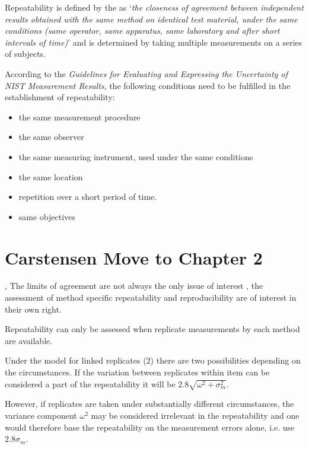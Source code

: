 \documentclass[12pt, a4paper]{report}
\theoremstyle{plain}
\theoremstyle{definition}
\theoremstyle{remark}
\begin{document}
		Repeatability is defined by the \citet{IUPAC} as `\textit{the closeness of agreement between independent results obtained with the same method on identical test material, under the same conditions (same
			operator, same apparatus, same laboratory and after short intervals of time)}'  and is determined by taking multiple measurements on a series of subjects.
	
	
		According to the \textit{Guidelines for Evaluating and Expressing the Uncertainty of NIST Measurement Results}, the following conditions need to be fulfilled in the establishment of repeatability:
		\begin{itemize}
			\item	the same measurement procedure
			\item	the same observer
			\item	the same measuring instrument, used under the same conditions
			\item	the same location
			\item	repetition over a short period of time.
			\item  same objectives
		\end{itemize}
		
		
	
		




	\section{Carstensen Move to Chapter 2}
	, The limits of agreement are not always the only issue of
	interest , the assessment of method specific repeatability and
	reproducibility are of interest in their own right.
	
	Repeatability can only be assessed when replicate
	measurements by each method are available.
	
	Under the model for linked replicates (2) there are two
	possibilities depending on the circumstances.
	If the variation between replicates within item can be
	considered a part of the repeatability it will be $2.8 \sqrt{
		\omega^2 + \sigma^2_m}$.
	
	However, if replicates are taken under substantially
	different circumstances, the variance component $\omega^2$ may be
	considered irrelevant in the repeatability and one would therefore
	base the repeatability on the measurement errors alone, i.e. use
	$2.8 \sigma_m$.
	
\end{document}

